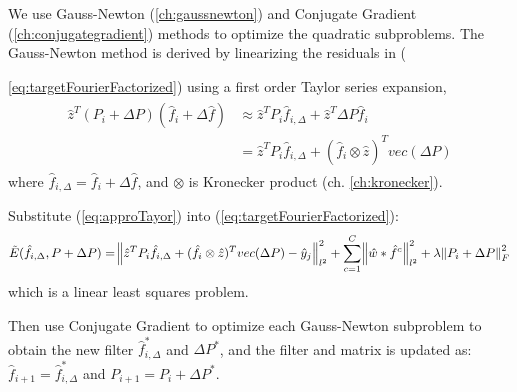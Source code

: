 \documentclass[12pt]{article}
\numberwithin{equation}{section}
\begin{document}
We use Gauss-Newton (\ref{ch:gaussnewton})  and Conjugate Gradient (\ref{ch:conjugategradient}) methods to optimize the quadratic subproblems. The Gauss-Newton method is derived by linearizing the residuals in ({\ref{eq:targetFourierFactorized}) using a first order Taylor series expansion, 
\begin{align} \begin{split} \label{eq:approTayor}
	\hat{z}^T(P_i+\Delta P)(\hat{f}_i+\Delta\hat{f}) 
	&\approx \hat{z}^T P_i \hat{f}_{i, \Delta} +  \hat{z}^T \Delta P \hat{f}_{i} \\
	&= \hat{z}^T P_i \hat{f}_{i, \Delta} + (\hat{f}_i \otimes \hat{z})^T vec(\Delta P)
\end{split}\end{align} 
where $\hat{f}_{i, \Delta} = \hat{f}_i + \Delta \hat{f}$, and $\otimes$ is Kronecker product (ch. \ref{ch:kronecker}). \par
Substitute (\ref{eq:approTayor}) into (\ref{eq:targetFourierFactorized}):
\begin{equation} \label{eq:factorizedConvGaussNewton}
	\tilde{E}(\hat{f}_{i, \Delta}, P+\Delta P)
		=\norm{\hat{z}^TP_i\hat{f}_{i, \Delta}+ (\hat{f}_i \otimes \hat{z})^T vec(\Delta P)
 -\hat{y}_j}^2_{l^2}
		 + \sum^C_{c=1} \norm{\hat{w} * \hat{f}^c}^2_{l^2}
		 + \lambda \norm{P_i + \Delta P}^2_F
\end{equation} 
which is a linear least squares problem. \par
Then use Conjugate Gradient to optimize each Gauss-Newton subproblem to obtain the new filter 
$\hat{f}^*_{i, \Delta}$ and $\Delta P^*$, and the filter and matrix is updated as: $\hat{f}_{i+1}=\hat{f}^*_{i, \Delta}$
and $P_{i+1}=P_i+\Delta P^*$. \par
}
\end{document}
